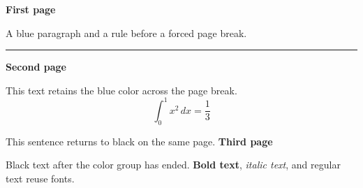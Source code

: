 \documentclass[a5paper]{article}
\begin{document}
\begingroup
\color[rgb]{0.1,0.3,0.7}
{\large\bfseries First page}\par
A blue paragraph and a rule before a forced page break.
\par\noindent\rule{70mm}{1pt}
\newpage
{\large\bfseries Second page}\par
This text retains the blue color across the page break.
\[ \int_0^1 x^2\,dx = \frac{1}{3} \]
\endgroup
\par This sentence returns to black on the same page.
\newpage
{\large\bfseries Third page}\par
Black text after the color group has ended.
\textbf{Bold text}, \textit{italic text}, and regular text reuse fonts.
\end{document}
